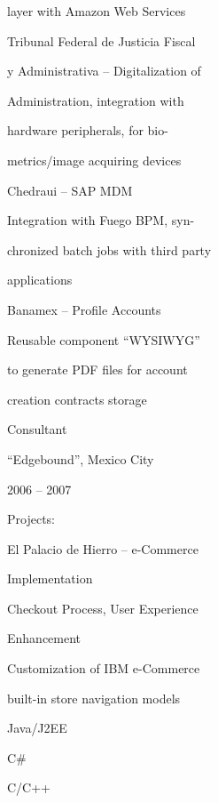 \documentclass[
]{article}
\begin{document}
\protect\hypertarget{f3}{}{layer with Amazon Web Services}

\protect\hypertarget{f3}{}{Tribunal Federal de Justicia Fiscal}

\protect\hypertarget{f3}{}{y Administrativa -- Digitalization of}

\protect\hypertarget{f3}{}{Administration, integration with}

\protect\hypertarget{f3}{}{hardware peripherals, for bio-}

\protect\hypertarget{f3}{}{metrics/image acquiring devices}

\protect\hypertarget{f3}{}{Chedraui -- SAP MDM}

\protect\hypertarget{f3}{}{Integration with Fuego BPM,
syn}\protect\hypertarget{f2}{}{-}

\protect\hypertarget{f3}{}{chronized batch jobs with third party}

\protect\hypertarget{f3}{}{applications}

\protect\hypertarget{f3}{}{Banamex -- Profile Accounts}

\protect\hypertarget{f2}{}{Reusable component
``}\protect\hypertarget{f3}{}{WYSIWYG}\protect\hypertarget{f2}{}{''}

\protect\hypertarget{f2}{}{to generate PDF
}\protect\hypertarget{f3}{}{files for account}

\protect\hypertarget{f3}{}{creation contracts storage}

\protect\hypertarget{f1}{}{Consultant}

\protect\hypertarget{f4}{}{``Edgebound'', Mexico City}

\protect\hypertarget{f1}{}{2006 -- 2007}

\protect\hypertarget{f1}{}{Projects:}

\protect\hypertarget{f3}{}{El Palacio de Hierro -- e-Commerce}

\protect\hypertarget{f3}{}{Implementation}

\protect\hypertarget{f3}{}{Checkout Process, User Experience}

\protect\hypertarget{f2}{}{Enhancement}

\protect\hypertarget{f3}{}{Customization of IBM e-Commerce}

\protect\hypertarget{f3}{}{built-in store navigation models}

\protect\hypertarget{f3}{}{Java/J2EE}

\protect\hypertarget{f2}{}{C\#}

\protect\hypertarget{f3}{}{C/C++}
\end{document}
